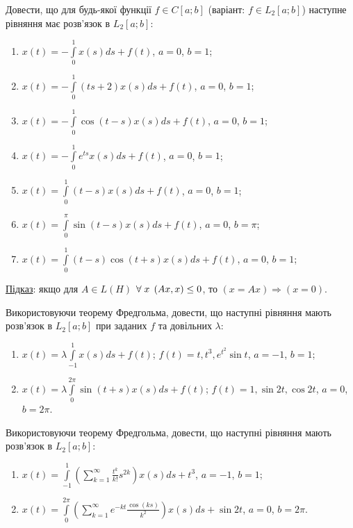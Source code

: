 \begin{exercise}
    Довести, що для будь-якої функції $f \in C[a;b]$ (варіант: $f \in L_2[a;b]$)
    наступне рівняння має розв'язок в $L_2[a;b]$:
    \begin{enumerate}
        \item $x(t) = -\int\limits^1_0 x(s) ds + f(t)$, $a=0$, $b=1$;
        \item $x(t) = -\int\limits^1_0 (ts+2)x(s)ds + f(t)$, $a=0$, $b=1$;
        \item $x(t) = -\int\limits^1_0 \cos(t-s)x(s)ds + f(t)$, $a=0$, $b=1$;
        \item $x(t) = -\int\limits^1_0 e^{ts}x(s)ds + f(t)$, $a=0$, $b=1$;
        \item $x(t) = \int\limits^1_0 (t-s)x(s)ds + f(t)$, $a=0$, $b=1$;
        \item $x(t) = \int\limits^\pi_0 \sin(t-s)x(s)ds + f(t)$, $a=0$, $b=\pi$;
        \item $x(t) = \int\limits^1_0 (t-s)\cos(t+s)x(s)ds + f(t)$, $a=0$, $b=1$;
    \end{enumerate}
\end{exercise}

\begin{theory}
    \ul{Підказ}: якщо для $A\in L(H)$ $\forall \; x \; \left(Ax, x\right) \leq 0$,
    то $(x=Ax) \Rightarrow (x=0)$.
\end{theory}

\begin{exercise}
    Використовуючи теорему Фредгольма, довести, що наступні рівняння мають розв'язок в $L_2[a;b]$
    при заданих $f$ та довільних $\lambda$:
    \begin{enumerate}
        \item $x(t) = \lambda \int\limits^1_{-1} x(s) ds + f(t)$;
              $f(t) = t, t^3, e^{t^2}\sin t$, $a=-1$, $b=1$;
        \item $x(t) = \lambda \int\limits^{2\pi}_0 \sin(t+s) x(s) ds + f(t)$; 
              $f(t) = 1, \sin 2t, \cos 2t$, $a=0$, $b=2\pi$.
    \end{enumerate}
\end{exercise}

\begin{exercise}
    Використовуючи теорему Фредгольма, довести, що наступні рівняння мають розв'язок в $L_2[a;b]$:
    \begin{enumerate}
        \item $x(t) = \int\limits^1_{-1} \left(
                \sum\limits^\infty_{k=1} \frac{t^k}{k!} s^{2k}
            \right) x(s) ds + t^3$, $a=-1$, $b=1$;
        \item $x(t) = \int\limits^{2\pi}_0 \left(
                \sum\limits^\infty_{k=1} e^{-kt} \frac{\cos(ks)}{k^2}
            \right) x(s) ds + \sin 2t$, $a=0$, $b=2\pi$.
    \end{enumerate}
\end{exercise}

